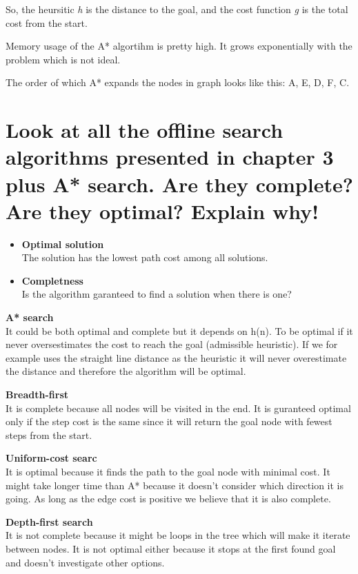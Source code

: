 \documentclass{article}
\begin{document}
So, the heursitic \textit{h} is the distance to the goal, and the cost function \textit{g} is the total cost from the start.

Memory usage of the A* algortihm is pretty high. It grows exponentially with the problem which is not ideal.

The order of which A* expands the nodes in graph looks like this: A, E, D, F, C.

\section*{Look at all the offline search algorithms presented in chapter 3 plus A* search. Are they complete? Are they optimal? Explain why!}

\begin{itemize}
	\item \textbf{Optimal solution} \\
	The solution has the lowest path cost among all solutions.
	\item \textbf{Completness} \\
	Is the algorithm garanteed to find a solution when there is one?
\end{itemize}

\textbf{A* search}\\
It could be both optimal and complete but it depends on h(n). To be optimal if it never oversestimates the cost to reach the goal (admissible heuristic).
If we for example uses the straight line distance as the heuristic it will never overestimate the distance and therefore the algorithm will be optimal. 

\textbf{Breadth-first}\\
It is complete because all nodes will be visited in the end. It is guranteed optimal only if the step cost is the same since it will return the goal node
with fewest steps from the start.

\textbf{Uniform-cost searc}\\
It is optimal because it finds the path to the goal node with minimal cost. It might take longer time than A* because it doesn't consider which direction
it is going. As long as the edge cost is positive we believe that it is also complete. 

\textbf{Depth-first search}\\
It is not complete because it might be loops in the tree which will make it iterate between nodes. It is not optimal either because it stops at the first
found goal and doesn't investigate other options. 
\end{document}
